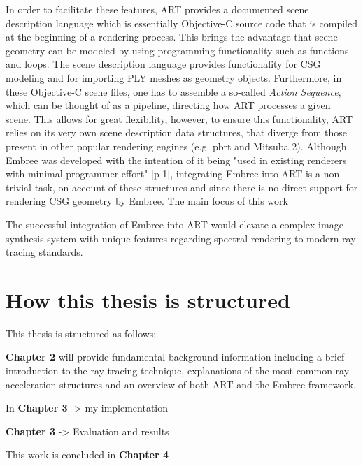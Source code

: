 In order to facilitate these features, ART provides a documented scene description language which is essentially Objective-C source code that is compiled at the beginning of a rendering process. This brings the advantage that scene geometry can be modeled by using programming functionality  such as functions and loops. The scene description language provides functionality for CSG modeling and for importing PLY meshes as geometry objects. Furthermore, in these Objective-C scene files, one has to assemble a so-called \emph{Action Sequence}, which can be thought of as a pipeline, directing how ART processes a given scene. 
This allows for great flexibility, however, to ensure this functionality, ART relies on its very own scene description data structures, that diverge from those present in other popular rendering engines (e.g. pbrt \cite{pharr2016physically} and Mitsuba 2).
Although Embree was developed with the intention of it being "used in existing renderers with minimal programmer effort" \cite{wald2014embree}[p 1], integrating Embree into ART is a non-trivial task, on account of these structures and since there is no direct support for rendering CSG geometry by Embree.
The main focus of this work

The successful integration of Embree into ART would elevate a complex image synthesis system with unique features regarding spectral rendering to modern ray tracing standards. 


\section*{How this thesis is structured}

This thesis is structured as follows: 

\textbf{Chapter 2} will provide fundamental background information including a brief introduction to the ray tracing technique, explanations of the most common ray acceleration structures and an overview of both ART and the Embree framework.

In \textbf{Chapter 3}  -> my implementation

\textbf{Chapter 3} -> Evaluation and results

This work is concluded in \textbf{Chapter 4}